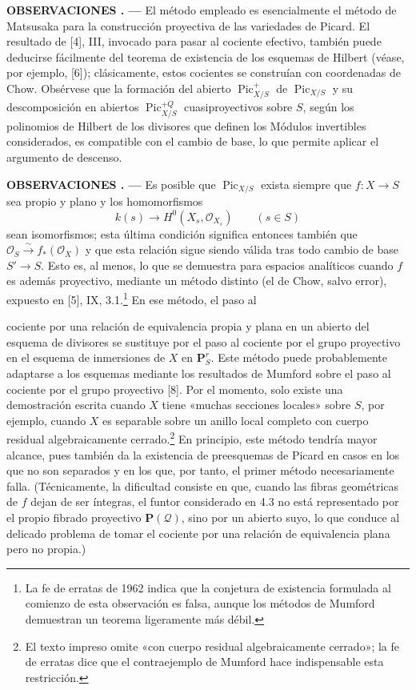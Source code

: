 \documentclass[11pt,twoside,openany]{book}
\numberwithin{equation}{section}
\newcommand{\src}[1]{%
  \phantomsection\hypertarget{src:#1}{}%
  \marginpar{\raggedleft\footnotesize\sffamily #1}%
}
\theoremstyle{plain}
\theoremstyle{definition}
\theoremstyle{remark}
\newcommand{\result}[2]{%
  \par\medskip\noindent\textbf{#1%
  \if\relax\detokenize{#2}\relax\else\space#2\fi. ---}\enspace
}
\newcommand{\FgaUnitKey}{frontmatter}
\renewcommand{\src}[1]{%
  \phantomsection\hypertarget{src:\FgaUnitKey:#1}{}%
  \marginpar{\raggedleft\footnotesize\sffamily #1}%
}
\theoremstyle{plain}
\theoremstyle{definition}
\theoremstyle{remark}
\begin{document}
\result{OBSERVACIONES}{5.1} El método empleado es esencialmente el método de
Matsusaka para la construcción proyectiva de las variedades de Picard. El
resultado de [4], III, invocado para pasar al cociente efectivo, también puede
deducirse fácilmente del teorema de existencia de los esquemas de Hilbert
(véase, por ejemplo, [6]); clásicamente, estos cocientes se construían con
coordenadas de Chow. Obsérvese que la formación del abierto
$\operatorname{Pic}^{+}_{X/S}$ de $\operatorname{Pic}_{X/S}$ y su
descomposición en abiertos $\operatorname{Pic}^{+Q}_{X/S}$ cuasiproyectivos
sobre $S$, según los polinomios de Hilbert de los divisores que definen los
Módulos invertibles considerados, es compatible con el cambio de base, lo que
permite aplicar el argumento de descenso.

\result{OBSERVACIONES}{5.2} Es posible que $\operatorname{Pic}_{X/S}$ exista
siempre que $f:X\longrightarrow S$ sea propio y plano y los homomorfismos
\[
k(s)\longrightarrow H^0(X_s,\mathcal O_{X_s})\qquad(s\in S)
\]
sean isomorfismos; esta última condición significa entonces también que
$\mathcal O_S\xrightarrow{\sim}f_*(\mathcal O_X)$ y que esta relación sigue
siendo válida tras todo cambio de base $S'\longrightarrow S$. Esto es, al
menos, lo que se demuestra para espacios analíticos cuando $f$ es además
proyectivo, mediante un método distinto (el de Chow, salvo error), expuesto en
[5], IX, 3.1.\footnote{La fe de erratas de 1962 indica que la conjetura de existencia
formulada al comienzo de esta observación es falsa, aunque los métodos de
Mumford demuestran un teorema ligeramente más débil.} En ese método, el paso al

\src{156}
cociente por una relación de equivalencia propia y plana en un abierto del
esquema de divisores se sustituye por el paso al cociente por el grupo
proyectivo en el esquema de inmersiones de $X$ en $\mathbf P^r_S$. Este método
puede probablemente adaptarse a los esquemas mediante los resultados de
Mumford sobre el paso al cociente por el grupo proyectivo [8]. Por el momento,
solo existe una demostración escrita cuando $X$ tiene «muchas secciones
locales» sobre $S$, por ejemplo, cuando $X$ es separable sobre un anillo local
completo con cuerpo residual algebraicamente
cerrado.\footnote{El texto impreso omite «con cuerpo residual algebraicamente
cerrado»; la fe de erratas dice que el contraejemplo de Mumford hace indispensable
esta restricción.} En principio, este método tendría mayor alcance, pues también
da la existencia de preesquemas de Picard en casos en los que no son separados
y en los que, por tanto, el primer método necesariamente falla. (Técnicamente,
la dificultad consiste en que, cuando las fibras geométricas de $f$ dejan de
ser íntegras, el funtor considerado en 4.3 no está representado por el propio
fibrado proyectivo $\mathbf P(\mathcal Q)$, sino por un abierto suyo, lo que
conduce al delicado problema de tomar el cociente por una relación de
equivalencia plana pero no propia.)
\end{document}
